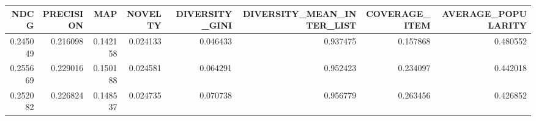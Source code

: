 \begin{tabular}{rrrrrrrr}
\toprule
    NDCG &  PRECISION &      MAP &  NOVELTY &  DIVERSITY\_GINI &  DIVERSITY\_MEAN\_INTER\_LIST &  COVERAGE\_ITEM &  AVERAGE\_POPULARITY \\
\midrule
0.245049 &   0.216098 & 0.142158 & 0.024133 &        0.046433 &                   0.937475 &       0.157868 &            0.480552 \\
0.255669 &   0.229016 & 0.150188 & 0.024581 &        0.064291 &                   0.952423 &       0.234097 &            0.442018 \\
0.252082 &   0.226824 & 0.148537 & 0.024735 &        0.070738 &                   0.956779 &       0.263456 &            0.426852 \\
\bottomrule
\end{tabular}
